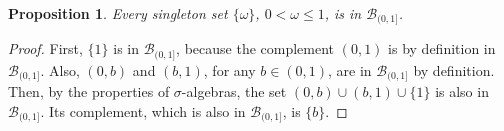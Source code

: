 \documentclass{book}
\theoremstyle{plain}%
\newtheorem{proposition}{Proposition}[section]
\theoremstyle{definition}
\newlength{\arrow}
\begin{document}
\begin{proposition}
Every singleton set $\{\omega\}$, $0 < \omega \leq 1$, is in $\mathcal{B}_{(0,1]}$.
\end{proposition}
\begin{proof}
First, $\{1\}$ is in $\mathcal{B}_{(0,1]}$, because the complement $(0, 1)$ is by definition in $\mathcal{B}_{(0,1]}$. Also, $(0,b)$ and $(b,1)$, for any $b \in (0, 1)$, are in $\mathcal{B}_{(0,1]}$ by definition. Then, by the properties of $\sigma$-algebras, the set $(0,b) \cup (b,1) \cup \{1\}$ is also in $\mathcal{B}_{(0,1]}$. Its complement, which is also in $\mathcal{B}_{(0,1]}$, is $\{b\}$.
\end{proof}
%
%
%
%
\end{document}
